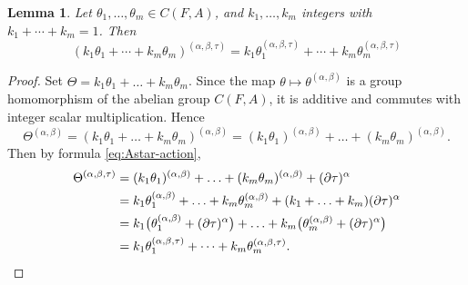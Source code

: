\documentclass[12pt,a4paper]{amsart}
\newtheorem{lemma}[theorem]{Lemma}
\theoremstyle{definition}
\begin{document}
\begin{lemma} \label{lem:why-affine}
Let $\theta_1,\ldots,\theta_m\in C(F,A)$, and $k_1,\ldots,k_m$ integers with $k_1+\cdots+k_m=1$. Then
\[(k_1\theta_1+\cdots+k_m\theta_m)^{(\alpha,\beta,\tau)} = k_1\theta_1^{(\alpha,\beta,\tau)}+\cdots+k_m\theta_m^{(\alpha,\beta,\tau)}\]
\end{lemma}
\begin{proof} 
Set $\Theta=k_1\theta_1+\ldots+k_m\theta_m$. Since the map $\theta\mapsto \theta^{(\alpha,\beta)}$ is a group homomorphism of the abelian group $C(F, A)$, it is additive and commutes with integer scalar multiplication.
Hence
\[
\Theta^{(\alpha,\beta)}=
(k_1\theta_1+\ldots+k_m\theta_m)^{(\alpha,\beta)}
=(k_1\theta_1)^{(\alpha,\beta)}+\ldots+(k_m\theta_m)^{(\alpha,\beta)}.
\]
Then by formula \eqref{eq:Astar-action},
\begin{align*}
\Theta^{(\alpha,\beta,\tau)}
&=
(k_1\theta_1)^{(\alpha,\beta)}+\ldots+(k_m\theta_m)^{(\alpha,\beta)}+(\partial{\tau})^{\alpha}\\
&=
k_1\theta_1^{(\alpha,\beta)}+\ldots+k_m\theta_m^{(\alpha,\beta)}+(k_1+\ldots+k_m)(\partial{\tau})^{\alpha}\\
&=
k_1\bigl(\theta_1^{(\alpha,\beta)}+(\partial\tau)^{\alpha}\bigr)+\ldots+k_m\bigl(\theta_m^{(\alpha,\beta)}+(\partial\tau)^{\alpha}\bigr)\\
&=k_1\theta_1^{(\alpha,\beta,\tau)}+\cdots+k_m\theta_m^{(\alpha,\beta,\tau)}.
\qedhere
\end{align*}
\end{proof}
\end{document}
